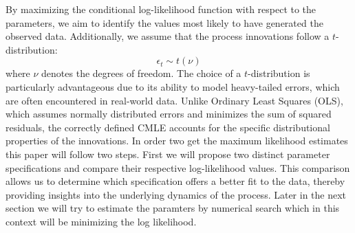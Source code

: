 \documentclass[a4paper,12pt]{article}
\begin{document}
By maximizing the conditional log-likelihood function with respect to the parameters, we aim to identify the values most likely to have generated the observed data. Additionally, we assume that the process innovations follow a $t$-distribution:
 \begin{equation}
     \epsilon_t \sim t(\nu) 
 \end{equation}
 where $\nu$ denotes the degrees of freedom.
The choice of a $t$-distribution is particularly advantageous due to its ability to model heavy-tailed errors, which are often encountered in real-world data. Unlike Ordinary Least Squares (OLS), which assumes normally distributed errors and minimizes the sum of squared residuals, the correctly defined CMLE accounts for the specific distributional properties of the innovations.
In order two get the maximum likelihood estimates this paper will follow two steps. First we will propose two distinct parameter specifications and compare their respective log-likelihood values. This comparison allows us to determine which specification offers a better fit to the data, thereby providing insights into the underlying dynamics of the process.
Later in the next section we will try to estimate the paramters by numerical search which in this context will be minimizing the log likelihood.
\end{document}
